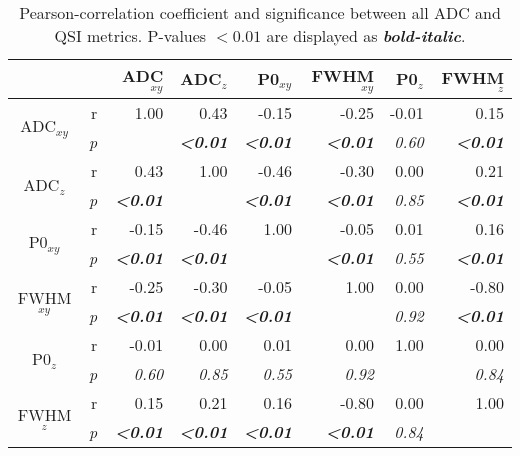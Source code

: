 \begin{table}
 \caption[Pearson-correlation coefficient and significance between all ADC and QSI metrics.]{Pearson-correlation coefficient and significance between all ADC and QSI metrics. P-values $<0.01$ are displayed as \textbf{\textit{bold-italic}}.}
 \centering
 \begin{adjustbox}{width=0.9\textwidth,keepaspectratio}
 \begin{minipage}{\textwidth}
    \begin{tabular}{rrrrrrrr}
    \addlinespace
    \toprule
              &       & ADC$_{xy}$  & ADC$_{z}$  & P0$_{xy}$   & FWHM$_{xy}$   & P0$_{z}$   & FWHM$_{z}$ \\
    \midrule
    \multicolumn{1}{c}{\multirow{2}[0]{*}{ADC$_{xy}$}} & r   & 1.00  & 0.43  & -0.15 & -0.25 & -0.01 & 0.15 \\
    \multicolumn{1}{c}{} & \textit{p} & \textit{} & \textbf{\textit{<0.01}} & \textbf{\textit{<0.01}} & \textbf{\textit{<0.01}} & \textit{0.60} & \textbf{\textit{<0.01}} \\
    \multicolumn{1}{c}{\multirow{2}[0]{*}{ADC$_{z}$}} & r   & 0.43  & 1.00  & -0.46 & -0.30 & 0.00  & 0.21 \\
    \multicolumn{1}{c}{} & \textit{p} & \textbf{\textit{<0.01}} & \textit{} & \textbf{\textit{<0.01}} & \textbf{\textit{<0.01}} & \textit{0.85} & \textbf{\textit{<0.01}} \\
    \multicolumn{1}{c}{\multirow{2}[0]{*}{P0$_{xy}$}} & r   & -0.15 & -0.46 & 1.00  & -0.05 & 0.01  & 0.16 \\
    \multicolumn{1}{c}{} & \textit{p} & \textbf{\textit{<0.01}} & \textbf{\textit{<0.01}} & \textit{} & \textbf{\textit{<0.01}} & \textit{0.55} & \textbf{\textit{<0.01}} \\
    \multicolumn{1}{c}{\multirow{2}[0]{*}{FWHM$_{xy}$}} & r   & -0.25 & -0.30 & -0.05 & 1.00  & 0.00  & -0.80 \\
    \multicolumn{1}{c}{} & \textit{p} & \textbf{\textit{<0.01}} & \textbf{\textit{<0.01}} & \textbf{\textit{<0.01}} & \textit{} & \textit{0.92} & \textbf{\textit{<0.01}} \\
    \multicolumn{1}{c}{\multirow{2}[0]{*}{P0$_{z}$}} & r   & -0.01 & 0.00  & 0.01  & 0.00  & 1.00  & 0.00 \\
    \multicolumn{1}{c}{} & \textit{p} & \textit{0.60} & \textit{0.85} & \textit{0.55} & \textit{0.92} & \textit{} & \textit{0.84} \\
    \multicolumn{1}{c}{\multirow{2}[0]{*}{FWHM$_{z}$}} & r   & 0.15  & 0.21  & 0.16  & -0.80 & 0.00  & 1.00 \\
    \multicolumn{1}{c}{} & \textit{p} & \textbf{\textit{<0.01}} & \textbf{\textit{<0.01}} & \textbf{\textit{<0.01}} & \textbf{\textit{<0.01}} & \textit{0.84} & \textit{} \\
    \bottomrule
    \end{tabular}%
  	\end{minipage}
	\end{adjustbox}
	\label{tab:chapter5 exp2 correlations}	
\end{table}
